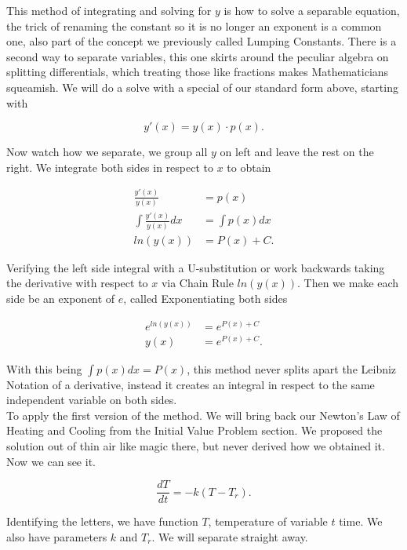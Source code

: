 \documentclass[12pt]{article}
\begin{document}
This method of integrating and solving for $y$ is how to solve a separable equation, the trick of renaming the constant so it is no longer an exponent is a common one, also part of the concept we previously called Lumping Constants. There is a second way to separate variables, this one skirts around the peculiar algebra on splitting differentials, which treating those like fractions makes Mathematicians squeamish. We will do a solve with a special of our standard form above, starting with

\begin{equation*}
    y'(x)=y(x)\cdot p(x).
\end{equation*}

Now watch how we separate, we group all $y$ on left and leave the rest on the right. We integrate both sides in respect to $x$ to obtain

\begin{align*}
    \frac{y'(x)}{y(x)} &= p(x) \\
    \int \frac{y'(x)}{y(x)} dx &= \int p(x) dx \\
    ln(y(x)) &= P(x)+C.
\end{align*}

Verifying the left side integral with a U-substitution or work backwards taking the derivative with respect to $x$ via Chain Rule  $ln(y(x))$. Then we make each side be an exponent of $e$, called Exponentiating both sides

\begin{align*}
    e^{ln(y(x))}&=e^{P(x)+C} \\
    y(x)&=e^{P(x)+C}.
\end{align*}

With this being $\int p(x) dx= P(x)$, this method never splits apart the Leibniz Notation of a derivative, instead it creates an integral in respect to the same independent variable on both sides. \\

To apply the first version of the method. We will bring back our Newton's Law of Heating and Cooling from the Initial Value Problem section. We proposed the solution out of thin air like magic there, but never derived how we obtained it. Now we can see it.

\begin{equation*}
    \frac{dT}{dt}=-k(T-T_r).
\end{equation*}

Identifying the letters, we have function $T$, temperature of variable $t$ time. We also have parameters $k$ and $T_r$. We will separate straight away.
\end{document}
